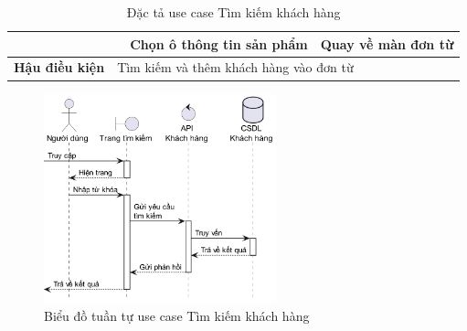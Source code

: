 \documentclass[../DoAn.tex]{subfiles}
\begin{document}
\begin{table}[H]
\begin{tabular}{|l|c|l|l|}
                                                &                                                             & Chọn ô thông tin sản phẩm               & Quay về màn đơn từ                              \\ \hline
        \textbf{Hậu điều kiện}                  & \multicolumn{3}{l|}{Tìm kiếm và thêm khách hàng vào đơn từ}                                                                                             \\ \hline
    \end{tabular}
    \caption{Đặc tả use case Tìm kiếm khách hàng}
    \label{table:uc-client-search}
\end{table}
\break

\begin{figure}[H]
    \centering
    \includegraphics[width=0.6\textwidth]{Hinhve/sequences/ClientSearch.png}
    \caption{Biểu đồ tuần tự use case Tìm kiếm khách hàng}
    \label{figure:sd-client-search}
\end{figure}
\end{document}
